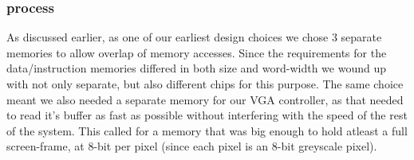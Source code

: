 \begin{comment}
Skrev om for å skille ut prosess
~Mads

Since the requirements for the data/instruction memories differed in both size and word-width 
we wound up with not only separate, but also different chips for this purpose (The data-memory required
8-bit words, the instruction-width was 24-bit, and since we wanted to avoid using multiple memory accesses
to get a complete instruction, we needed a wide enough memory chip for that purpose. 24-bit chips were out of
production, and 32-bit memory was too expensive, thus the solution became 2x16-bit chips with their address-lines
connected together and 8 ignored I/O-pins, effectively making them a 24-bit memory).

Since we wanted to reduce the sharing of memories as much as possible, we also needed a separate memory for
our \ac{VGA} controller, as that needed to read it's buffer as fast as possible without interfering with the speed
of the rest of the system. This called for a memory that was big enough to hold atleast a full screen-frame,
at 8-bit per pixel (since each pixel is an 8-bit greyscale pixel).

To reduce the possibility of having too slow data-access from the AVR, an extra memory was added to work as
a buffer for the AVR as well. This design choice was made {\em after} ordering, which meant that we had to choose from
the chips we had already ordered to fit this purpose. Since this was intended to carry data intended for the rest
of the system, and as the rest of the system is working with data in 8-bit bytes, we ended up using one of the
extra chips ordered as \ac{VGA} memory for this purpose.

Forresten, da vart det så kort at jeg bare tødde det in i avsnittet over. Må få jobbet prosess-delene inn igjen et eller annet sted!
~Mads
\end{comment}

\subsubsection{process}

As discussed earlier, as one of our earliest design choices we chose 3 separate memories to allow overlap of
memory accesses. Since the requirements for the data/instruction memories differed in both size and word-width 
we wound up with not only separate, but also different chips for this purpose. The same choice meant we also
needed a separate memory for our \ac{VGA} controller, as that needed to read it's buffer as fast as possible
without interfering with the speed of the rest of the system. This called for a memory that was big enough to
hold atleast a full screen-frame, at 8-bit per pixel (since each pixel is an 8-bit greyscale pixel).

